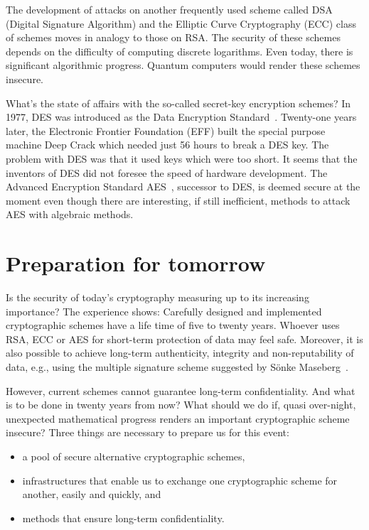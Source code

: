 The development of attacks on another frequently
used scheme called DSA (Digital Signature
Algorithm) and the Elliptic Curve Cryptography
(ECC) class of schemes moves in analogy to those
on RSA.  The security of these schemes depends on
the difficulty of computing discrete logarithms.
Even today, there is significant algorithmic
progress.  Quantum computers would render these
schemes insecure.

What's the state of affairs with the so-called
secret-key encryption schemes?  In 1977, DES was
introduced as the Data Encryption
Standard~\cite{DES-Standard:1977}.  Twenty-one
years later, the Electronic Frontier Foundation
(EFF) built the special purpose machine Deep Crack
which needed just 56 hours to break a DES key.
The problem with DES was that it used keys which
were too short.  It seems that the inventors of
DES did not foresee the speed of hardware
development.  The Advanced Encryption Standard
AES~\cite{AES-Standard:2002}, successor to DES, is
deemed secure at the moment even though there are
interesting, if still inefficient, methods to
attack AES with algebraic methods.


\section{Preparation for tomorrow}
\label{sec:preparations}

Is the security of today's cryptography measuring
up to its increasing importance?  The experience
shows: Carefully designed and implemented
cryptographic schemes have a life time of five to
twenty years.  Whoever uses RSA, ECC or AES for
short-term protection of data may feel safe.
Moreover, it is also possible to achieve long-term
authenticity, integrity and non-reputability of
data, e.g., using the multiple signature scheme
suggested by S\"onke Maseberg~\cite{maseberg-thesis:2002}.

However, current schemes cannot guarantee
long-term confidentiality.  And what is to be done in
twenty years from now?  What should we do if, quasi
over-night, unexpected mathematical progress
renders an important cryptographic scheme
insecure?  Three things are necessary to prepare
us for this event:

\begin{itemize}
\item a pool of secure alternative cryptographic schemes,
\item infrastructures that enable us to exchange
   one cryptographic scheme for another, easily
   and quickly, and
\item methods that ensure long-term confidentiality.
\end{itemize}

